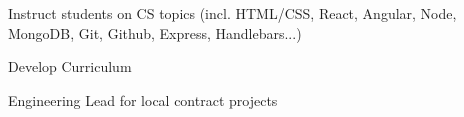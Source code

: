 \documentclass[letterpaper]{deedy-resume} %
\begin{document}
\begin{minipage}[t]{0.66\textwidth}
\sectionspace %


\begin{tightitemize}
\item Instruct students on CS topics (incl. HTML/CSS, React, Angular, Node, MongoDB, Git, Github, Express, Handlebars...)
\item Develop Curriculum
\item Engineering Lead for local contract projects
\end{tightitemize}

\sectionspace %










\end{minipage} %
\end{document}
